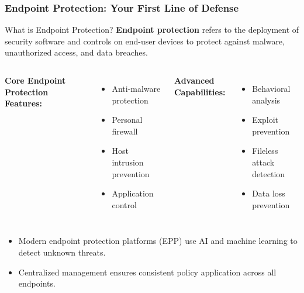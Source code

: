 \documentclass{beamer}
\begin{document}
    \begin{frame}
    \frametitle{Endpoint Protection: Your First Line of Defense}
    
    \begin{block}{What is Endpoint Protection?}
    \textbf{Endpoint protection} refers to the deployment of security software and controls on end-user devices to protect against malware, unauthorized access, and data breaches.
    \end{block}
    
    \begin{columns}[t]
    \textbf{Core Endpoint Protection Features:}
    \begin{itemize}
    \item Anti-malware protection
    \item Personal firewall
    \item Host intrusion prevention
    \item Application control
    \end{itemize}
    
    \textbf{Advanced Capabilities:}
    \begin{itemize}
    \item Behavioral analysis
    \item Exploit prevention
    \item Fileless attack detection
    \item Data loss prevention
    \end{itemize}
    \end{columns}
    
    \vspace{0.5cm}
    \begin{itemize}
    \item Modern endpoint protection platforms (EPP) use AI and machine learning to detect unknown threats.
    \item Centralized management ensures consistent policy application across all endpoints.
    \end{itemize}
    
\end{frame}
    
\end{document}

